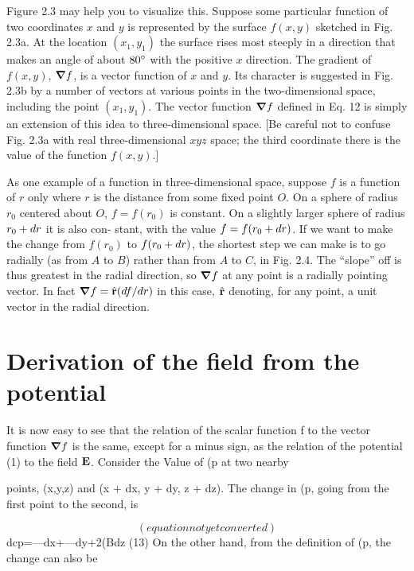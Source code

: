 Figure 2.3 may help you to visualize this. Suppose some particular
function of two coordinates $x$ and $y$ is represented by the surface
$f(x,y)$ sketched in Fig. 2.3a. At the location $(x_1,y_1)$ the surface rises
most steeply in a direction that makes an angle of about $80\mspace{0mu}^\circ$ with the
positive $x$ direction. The gradient of $f(x,y)$, $\boldsymbol{\nabla} f$, is a vector function
of $x$ and $y$. Its character is suggested in Fig. 2.3b by a number of
vectors at various points in the two-dimensional space, including the
point $(x_1,y_1)$. The vector function $\boldsymbol{\nabla} f$ defined in Eq. 12 is simply an
extension of this idea to three-dimensional space. [Be careful not to
confuse Fig. 2.3a with real three-dimensional $xyz$ space; the third
coordinate there is the value of the function $f(x,y)$.]

As one example of a function in three-dimensional space, suppose
$f$ is a function of $r$ only where $r$ is the distance from some fixed
point $O$. On a sphere of radius $r_0$ centered about $O$, $f = f(r_0)$ is
constant. On a slightly larger sphere of radius $r_0 + d r$ it is also con-
stant, with the value $f = f(r_0 + d r)$. If we want to make the change
from $f(r_0)$ to $f(r_0 + d r)$, the shortest step we can make is to go
radially (as from $A$ to $B$) rather than from $A$ to $C$, in Fig. 2.4. The
``slope'' off is thus greatest in the radial direction, so $\boldsymbol{\nabla} f$ at any point
is a radially pointing vector. In fact $\boldsymbol{\nabla} f = \hat{\mathbf{r}} (d f/d r)$ in this case,
$\hat{\mathbf{r}}$ denoting, for any point, a unit vector in the radial direction.

\iffalse

\section{Derivation of the field from the potential}

It is now easy to see that the relation of the scalar function f to the
vector function $\boldsymbol{\nabla} f$ is the same, except for a minus sign, as the relation
of the potential (1) to the field $\mathbf{E}$. Consider the Value of (p at two nearby

points, (x,y,z) and (x + dx, y + dy, z + dz). The change in (p, going
from the first point to the second, is

\begin{equation}
(equation not yet converted)
\end{equation}
dcp=---dx+---dy+2(Bdz (13)
On the other hand, from the definition of (p, the change can also be

